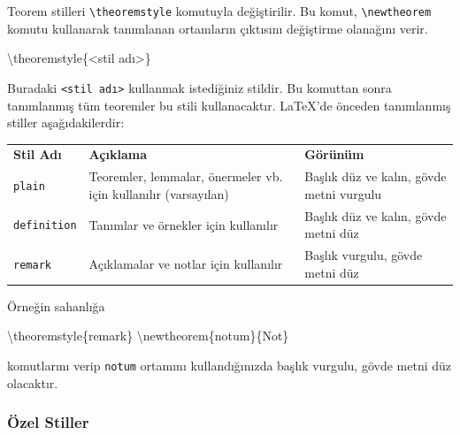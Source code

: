 \documentclass[
  10pt,
]{scrbook}
\newenvironment{Shaded}{\begin{snugshade}}{\end{snugshade}}
\newcommand{\FunctionTok}[1]{\textcolor[rgb]{0.00,0.00,0.00}{#1}}
\newcommand{\NormalTok}[1]{#1}
\theoremstyle{definition}
\theoremstyle{definition}
\theoremstyle{definition}
\theoremstyle{definition}
\theoremstyle{remark}
\begin{document}
Teorem stilleri \texttt{\textbackslash{}theoremstyle} komutuyla değiştirilir. Bu komut, \texttt{\textbackslash{}newtheorem} komutu kullanarak tanımlanan ortamların çıktısını değiştirme olanağını verir.

\begin{Shaded}
\begin{Highlighting}[]
\FunctionTok{\textbackslash{}theoremstyle}\NormalTok{\{\textless{}stil adı\textgreater{}\}}
\end{Highlighting}
\end{Shaded}

Buradaki \texttt{\textless{}stil\ adı\textgreater{}} kullanmak istediğiniz stildir. Bu komuttan sonra tanımlanmış tüm teoremler bu stili kullanacaktır. LaTeX'de önceden tanımlanmış stiller aşağıdakilerdir:

\begin{longtable}[]{@{}
  >{\raggedright\arraybackslash}p{}
  >{\raggedright\arraybackslash}p{}
  >{\raggedright\arraybackslash}p{}@{}}
\toprule
\endhead
\textbf{Stil Adı} & \textbf{Açıklama} & \textbf{Görünüm} \\
\texttt{plain} & Teoremler, lemmalar, önermeler vb. için kullanılır (varsayılan) & Başlık düz ve kalın, gövde metni vurgulu \\
\texttt{definition} & Tanımlar ve örnekler için kullanılır & Başlık düz ve kalın, gövde metni düz \\
\texttt{remark} & Açıklamalar ve notlar için kullanılır & Başlık vurgulu, gövde metni düz \\
\bottomrule
\end{longtable}

Örneğin sahanlığa

\begin{Shaded}
\begin{Highlighting}[]
\FunctionTok{\textbackslash{}theoremstyle}\NormalTok{\{remark\}}
\FunctionTok{\textbackslash{}newtheorem}\NormalTok{\{notum\}\{Not\}}
\end{Highlighting}
\end{Shaded}

komutlarını verip \texttt{notum} ortamını kullandığınızda başlık vurgulu, gövde metni düz olacaktır.

\hypertarget{uxf6zel-stiller}{%
\subsubsection{Özel Stiller}\label{uxf6zel-stiller}}
\end{document}
